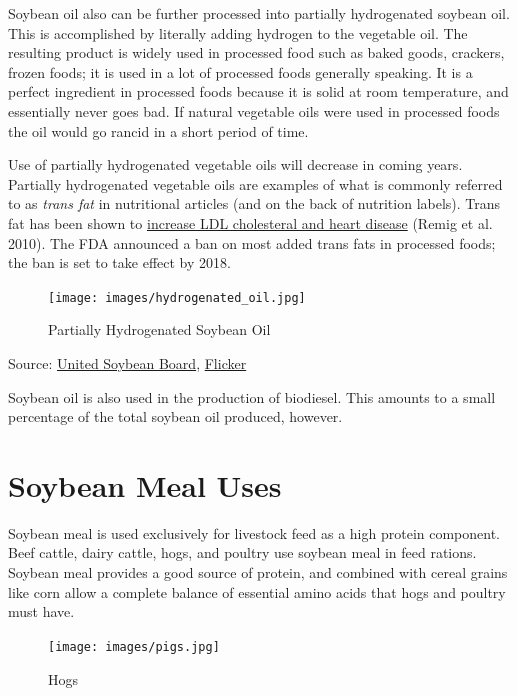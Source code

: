\documentclass[
  letterpaper,
  DIV=11,
  numbers=noendperiod]{scrreprt}
\begin{document}
Soybean oil also can be further processed into partially hydrogenated
soybean oil. This is accomplished by literally adding hydrogen to the
vegetable oil. The resulting product is widely used in processed food
such as baked goods, crackers, frozen foods; it is used in a lot of
processed foods generally speaking. It is a perfect ingredient in
processed foods because it is solid at room temperature, and essentially
never goes bad. If natural vegetable oils were used in processed foods
the oil would go rancid in a short period of time.

Use of partially hydrogenated vegetable oils will decrease in coming
years. Partially hydrogenated vegetable oils are examples of what is
commonly referred to as \emph{trans fat} in nutritional articles (and on
the back of nutrition labels). Trans fat has been shown to
\href{http://www.fda.gov/ForConsumers/ConsumerUpdates/ucm372915.htm}{increase
LDL cholesteral and heart disease} (Remig et al. 2010). The FDA
announced a ban on most added trans fats in processed foods; the ban is
set to take effect by 2018.

\begin{figure}

{\centering \texttt{[image: images/hydrogenated\_oil.jpg]}

}

\caption{Partially Hydrogenated Soybean Oil}

\end{figure}

Source: \href{http://unitedsoybean.org/}{United Soybean Board},
\href{https://www.flickr.com/photos/unitedsoybean/16910795086/}{Flicker}

Soybean oil is also used in the production of biodiesel. This amounts to
a small percentage of the total soybean oil produced, however.

\hypertarget{soybean-meal-uses}{%
\section{Soybean Meal Uses}\label{soybean-meal-uses}}

Soybean meal is used exclusively for livestock feed as a high protein
component. Beef cattle, dairy cattle, hogs, and poultry use soybean meal
in feed rations. Soybean meal provides a good source of protein, and
combined with cereal grains like corn allow a complete balance of
essential amino acids that hogs and poultry must have.

\begin{figure}

{\centering \texttt{[image: images/pigs.jpg]}

}

\caption{Hogs}

\end{figure}
\end{document}
